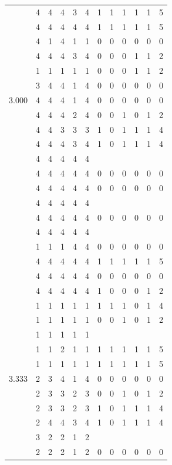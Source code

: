 \documentclass[]{book}
\theoremstyle{definition}
\theoremstyle{definition}
\theoremstyle{definition}
\theoremstyle{remark}
\begin{document}
\begin{table}
{\begin{tabular}[t]{rrrrrrrrrrrr}
 & 4 & 4 & 4 & 3 & 4 & 1 & 1 & 1 & 1 & 1 & 5\\
 & 4 & 4 & 4 & 4 & 4 & 1 & 1 & 1 & 1 & 1 & 5\\
 & 4 & 1 & 4 & 1 & 1 & 0 & 0 & 0 & 0 & 0 & 0\\
 & 4 & 4 & 4 & 3 & 4 & 0 & 0 & 0 & 1 & 1 & 2\\
 & 1 & 1 & 1 & 1 & 1 & 0 & 0 & 0 & 1 & 1 & 2\\
 & 3 & 4 & 4 & 1 & 4 & 0 & 0 & 0 & 0 & 0 & 0\\
3.000 & 4 & 4 & 4 & 1 & 4 & 0 & 0 & 0 & 0 & 0 & 0\\
 & 4 & 4 & 4 & 2 & 4 & 0 & 0 & 1 & 0 & 1 & 2\\
 & 4 & 4 & 3 & 3 & 3 & 1 & 0 & 1 & 1 & 1 & 4\\
 & 4 & 4 & 4 & 3 & 4 & 1 & 0 & 1 & 1 & 1 & 4\\
 & 4 & 4 & 4 & 4 & 4 &  &  &  &  &  & \\
 & 4 & 4 & 4 & 4 & 4 & 0 & 0 & 0 & 0 & 0 & 0\\
 & 4 & 4 & 4 & 4 & 4 & 0 & 0 & 0 & 0 & 0 & 0\\
 & 4 & 4 & 4 & 4 & 4 &  &  &  &  &  & \\
 & 4 & 4 & 4 & 4 & 4 & 0 & 0 & 0 & 0 & 0 & 0\\
 & 4 & 4 & 4 & 4 & 4 &  &  &  &  &  & \\
 & 1 & 1 & 1 & 4 & 4 & 0 & 0 & 0 & 0 & 0 & 0\\
 & 4 & 4 & 4 & 4 & 4 & 1 & 1 & 1 & 1 & 1 & 5\\
 & 4 & 4 & 4 & 4 & 4 & 0 & 0 & 0 & 0 & 0 & 0\\
 & 4 & 4 & 4 & 4 & 4 & 1 & 0 & 0 & 0 & 1 & 2\\
 & 1 & 1 & 1 & 1 & 1 & 1 & 1 & 1 & 0 & 1 & 4\\
 & 1 & 1 & 1 & 1 & 1 & 0 & 0 & 1 & 0 & 1 & 2\\
 & 1 & 1 & 1 & 1 & 1 &  &  &  &  &  & \\
 & 1 & 1 & 2 & 1 & 1 & 1 & 1 & 1 & 1 & 1 & 5\\
 & 1 & 1 & 1 & 1 & 1 & 1 & 1 & 1 & 1 & 1 & 5\\
3.333 & 2 & 3 & 4 & 1 & 4 & 0 & 0 & 0 & 0 & 0 & 0\\
 & 2 & 3 & 3 & 2 & 3 & 0 & 0 & 1 & 0 & 1 & 2\\
 & 2 & 3 & 3 & 2 & 3 & 1 & 0 & 1 & 1 & 1 & 4\\
 & 2 & 4 & 4 & 3 & 4 & 1 & 0 & 1 & 1 & 1 & 4\\
 & 3 & 2 & 2 & 1 & 2 &  &  &  &  &  & \\
 & 2 & 2 & 2 & 1 & 2 & 0 & 0 & 0 & 0 & 0 & 0\\

\end{tabular}}
\end{table}
\end{document}

